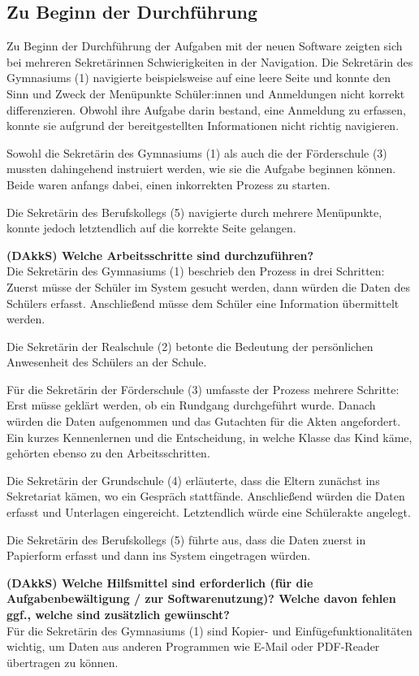\subsection{Zu Beginn der Durchführung}
Zu Beginn der Durchführung der Aufgaben mit der neuen Software zeigten sich bei mehreren Sekretärinnen Schwierigkeiten in der Navigation. Die Sekretärin des Gymnasiums (1) navigierte beispielsweise auf eine leere Seite und konnte den Sinn und Zweck der Menüpunkte \glqq Schüler:innen\grqq{} und \glqq Anmeldungen\grqq{} nicht korrekt differenzieren. Obwohl ihre Aufgabe darin bestand, eine Anmeldung zu erfassen, konnte sie aufgrund der bereitgestellten Informationen nicht richtig navigieren.

Sowohl die Sekretärin des Gymnasiums (1) als auch die der Förderschule (3) mussten dahingehend instruiert werden, wie sie die Aufgabe beginnen können. Beide waren anfangs dabei, einen inkorrekten Prozess zu starten.

Die Sekretärin des Berufskollegs (5) navigierte durch mehrere Menüpunkte, konnte jedoch letztendlich auf die korrekte Seite gelangen. 

\textbf{(DAkkS) Welche Arbeitsschritte sind durchzuführen?}\\
Die Sekretärin des Gymnasiums (1) beschrieb den Prozess in drei Schritten: Zuerst müsse der Schüler im System gesucht werden, dann würden die Daten des Schülers erfasst. Anschließend müsse dem Schüler eine Information übermittelt werden.

Die Sekretärin der Realschule (2) betonte die Bedeutung der persönlichen Anwesenheit des Schülers an der Schule.

Für die Sekretärin der Förderschule (3) umfasste der Prozess mehrere Schritte: Erst müsse geklärt werden, ob ein Rundgang durchgeführt wurde. Danach würden die Daten aufgenommen und das Gutachten für die Akten angefordert. Ein kurzes Kennenlernen und die Entscheidung, in welche Klasse das Kind käme, gehörten ebenso zu den Arbeitsschritten.

Die Sekretärin der Grundschule (4) erläuterte, dass die Eltern zunächst ins Sekretariat kämen, wo ein Gespräch stattfände. Anschließend würden die Daten erfasst und Unterlagen eingereicht. Letztendlich würde eine Schülerakte angelegt.

Die Sekretärin des Berufskollegs (5) führte aus, dass die Daten zuerst in Papierform erfasst und dann ins System eingetragen würden.


\textbf{(DAkkS) Welche Hilfsmittel sind erforderlich (für die Aufgabenbewältigung / zur Softwarenutzung)? Welche davon fehlen ggf., welche sind zusätzlich gewünscht?}\\
Für die Sekretärin des Gymnasiums (1) sind Kopier- und Einfügefunktionalitäten wichtig, um Daten aus anderen Programmen wie E-Mail oder PDF-Reader übertragen zu können.


